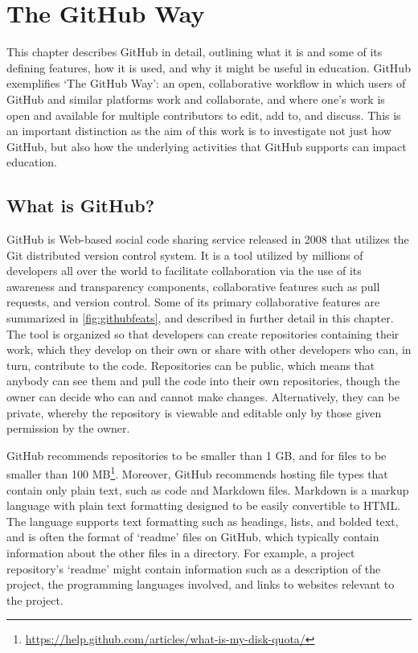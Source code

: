 \chapter{The GitHub Way}
This chapter describes GitHub in detail, outlining what it is and some of its defining features, how it is used, and why it might be useful in education. GitHub exemplifies `The GitHub Way': an open, collaborative workflow in which users of GitHub and similar platforms work and collaborate, and where one's work is open and available for multiple contributors to edit, add to, and discuss. This is an important distinction as the aim of this work is to investigate not just how GitHub, but also how the underlying activities that GitHub supports can impact education. %

\section{What is GitHub?}
GitHub is Web-based social code sharing service released in 2008 that utilizes the Git distributed version control system. It is a tool utilized by millions of developers all over the world to facilitate collaboration via the use of its awareness and transparency components, collaborative features such as pull requests, and version control. Some of its primary collaborative features are summarized in \ref{fig:githubfeats}, and described in further detail in this chapter. The tool is organized so that developers can create repositories containing their work, which they develop on their own or share with other developers who can, in turn, contribute to the code. Repositories can be public, which means that anybody can see them and pull the code into their own repositories, though the owner can decide who can and cannot make changes. Alternatively, they can be private, whereby the repository is viewable and editable only by those given permission by the owner.

GitHub recommends repositories to be smaller than 1 GB, and for files to be smaller than 100 MB\footnote{\url{https://help.github.com/articles/what-is-my-disk-quota/}}. Moreover, GitHub recommends hosting file types that contain only plain text, such as code and Markdown files. Markdown is a markup language with plain text formatting designed to be easily convertible to HTML. The language supports text formatting such as headings, lists, and bolded text, and is often the format of `readme' files on GitHub, which typically contain information about the other files in a directory. For example, a project repository's `readme' might contain information such as a description of the project, the programming languages involved, and links to websites relevant to the project.

